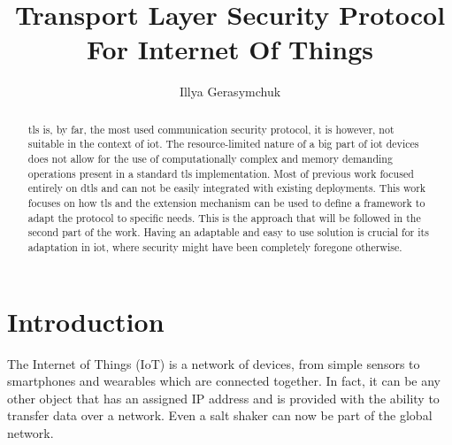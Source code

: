 \documentclass{llncs}
\begin{document}
%
\frontmatter          %
%
\pagestyle{headings}  %
%

\tableofcontents
\newpage

\mainmatter              %
%
\title{Transport Layer Security Protocol For Internet Of Things}
%
%
\author{{Illya Gerasymchuk} \\
}
%
%
%
\maketitle              %

\begin{abstract}
\gls{tls} is, by far, the most used communication security protocol, it is however, not suitable in the context of \gls{iot}. The resource-limited nature
of a big part of \gls{iot} devices does not allow for the use of computationally complex
and memory demanding operations present in a standard \gls{tls} implementation. Most of previous work focused entirely on \gls{dtls} and
can not be easily integrated with existing deployments. This work focuses on
how \gls{tls} and the extension mechanism can be used to define a framework
to adapt the protocol to specific needs. This is the approach that
will be followed in the second part of the work. Having an adaptable and
easy to use solution is crucial for its adaptation in \gls{iot},
where security might have been completely foregone otherwise.

\end{abstract}
%
\section{Introduction}
%

The Internet of Things (IoT) is a network of devices, from simple sensors to smartphones and wearables
which are connected together. In fact, it can be any other object that has an assigned
IP address and is provided with the ability to transfer data over a network. Even a salt shaker\cite{SMALTThe76:online} can now be part of the global network.
\end{document}

